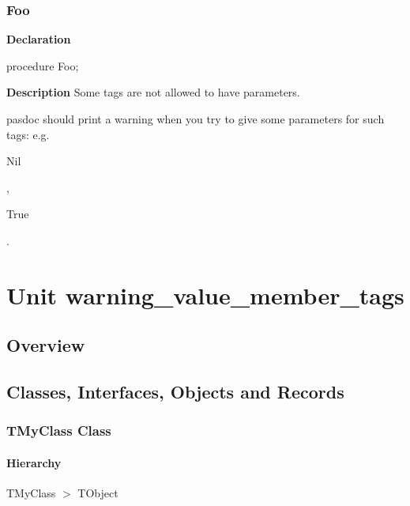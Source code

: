 \documentclass{report}
\begin{document}
\subsection*{Foo}
\begin{list}{}{
\setlength{\itemindent}{0cm}
\setlength{\listparindent}{0cm}
\setlength{\leftmargin}{\evensidemargin}
\addtolength{\leftmargin}{\tmplength}
\settowidth{\labelsep}{X}
\addtolength{\leftmargin}{\labelsep}
\setlength{\labelwidth}{\tmplength}
}
\begin{flushleft}
\item[\textbf{Declaration}\hfill]
\begin{ttfamily}
procedure Foo;\end{ttfamily}


\end{flushleft}
\par
\item[\textbf{Description}]
Some tags are not allowed to have parameters.

pasdoc should print a warning when you try to give some parameters for such tags: e.g. \begin{ttfamily}Nil\end{ttfamily}, \begin{ttfamily}True\end{ttfamily}.

\end{list}
\chapter{Unit warning{\_}value{\_}member{\_}tags}
\section{Overview}
\begin{description}
\item[\texttt{\begin{ttfamily}TMyClass\end{ttfamily} Class}]
\end{description}
\section{Classes, Interfaces, Objects and Records}
\subsection*{TMyClass Class}
\subsubsection*{\large{\textbf{Hierarchy}}\normalsize\hspace{1ex}\hfill}
TMyClass {$>$} TObject
\end{document}
